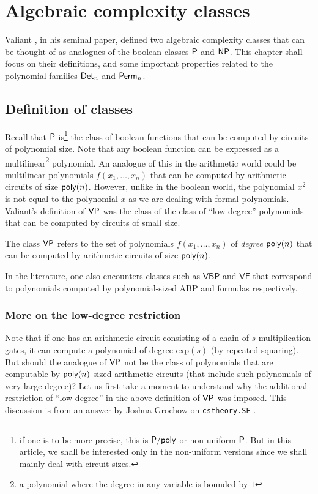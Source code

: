 \chapter{Algebraic complexity classes} \label{chap-vpvnp}

Valiant \cite{v79}, in his seminal paper, defined two algebraic complexity classes that can be thought of as analogues of the boolean classes $\P$ and $\mathsf{NP}$. This chapter shall focus on their definitions, and some important properties related to the polynomial families $\mathsf{Det}_n$ and $\mathsf{Perm}_n$. 

\section{Definition of classes}

Recall that $\P$ is\footnote{if one is to be more precise, this is $\mathsf{P}/\mathsf{poly}$ or non-uniform $\P$. But in this article, we shall be interested only in the non-uniform versions since we shall mainly deal with circuit sizes.} the class of boolean functions that can be computed by circuits of polynomial size. Note that any boolean function can be expressed as a multilinear\footnote{a polynomial where the degree in any variable is bounded by $1$} polynomial. An analogue of this in the arithmetic world could be multilinear polynomials $f(x_1,\dots, x_n)$ that can be computed by arithmetic circuits of size $\mathsf{poly}(n)$. However, unlike in the boolean world, the polynomial $x^2$ is not equal to the polynomial $x$ as we are dealing with formal polynomials. Valiant's definition of $\mathsf{VP}$ was the class of the class of ``low degree'' polynomials that can be computed by circuits of small size. 

\begin{definition}[Valiant's $\P$]\label{defn:vp}
The class $\mathsf{VP}$ refers to the set of polynomials $f(x_1,\dots, x_n)$ of \emph{degree $\mathsf{poly}(n)$} that can be computed by arithmetic circuits of size $\mathsf{poly}(n)$. 
\end{definition}

In the literature, one also encounters classes such as $\mathsf{VBP}$ and $\mathsf{VF}$ that correspond to polynomials computed by polynomial-sized ABP and formulas respectively.


\subsection*{More on the low-degree restriction}

Note that if one has an arithmetic circuit consisting of a chain of $s$ multiplication gates, it can compute a polynomial of degree $\mathrm{exp}(s)$ (by repeated squaring). But should the analogue of $\mathsf{VP}$ not be the class of polynomials that are computable by $\mathsf{poly}(n)$-sized arithmetic circuits (that include such polynomials of very large degree)? Let us first take a moment to understand why the additional restriction of ``low-degree'' in the above definition of $\mathsf{VP}$ was imposed. This discussion is from an answer by Joshua Grochow on \texttt{cstheory.SE} \cite{gro:SE}. 

